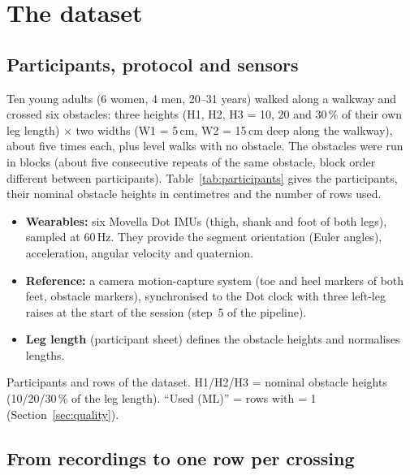 \section{The dataset}
\label{sec:data}

\subsection{Participants, protocol and sensors}

Ten young adults (6 women, 4 men, 20--31 years) walked along a walkway and crossed six obstacles: three heights
(H1, H2, H3 = 10, 20 and 30\,\% of their own leg length) $\times$ two widths (W1 = 5\,cm, W2 = 15\,cm deep along the
walkway), about five times each, plus level walks with no obstacle. The obstacles were run in blocks (about five
consecutive repeats of the same obstacle, block order different between participants). Table~\ref{tab:participants}
gives the participants, their nominal obstacle heights in centimetres and the number of rows used.

\begin{itemize}
  \item \textbf{Wearables:} six Movella Dot IMUs (thigh, shank and foot of both legs), sampled at 60\,Hz. They provide the
  segment orientation (Euler angles), acceleration, angular velocity and quaternion.
  \item \textbf{Reference:} a camera motion-capture system (toe and heel markers of both feet, obstacle markers),
  synchronised to the Dot clock with three left-leg raises at the start of the session (step~5 of the pipeline).
  \item \textbf{Leg length} (participant sheet) defines the obstacle heights and normalises lengths.
\end{itemize}

\begin{table}[htbp]
\centering
\caption{Participants and rows of the dataset. H1/H2/H3 = nominal obstacle heights (10/20/30\,\% of the leg length).
``Used (ML)'' = rows with  = 1 (Section~\ref{sec:quality}).}
\label{tab:participants}
\begin{adjustbox}{max width=\textwidth}
\small

\end{adjustbox}
\end{table}

\subsection{From recordings to one row per crossing}
\label{sec:rows}

